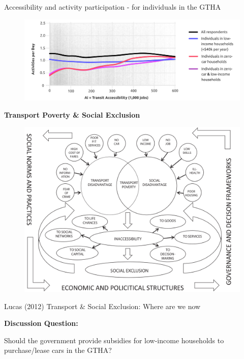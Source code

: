 \documentclass[aspectratio=169]{beamer}
\begin{document}
\begin{frame}
	
	Accessibility and activity participation - for individuals in the GTHA
	
	\begin{figure}
		\centering
		\includegraphics[width=0.94\linewidth]{images/accessibility_activities_gtha.png}
	\end{figure}
	
\end{frame}








\begin{frame}
	
	\textbf{Transport Poverty \& Social Exclusion}
	
	\begin{figure}
		\centering
		\includegraphics[width=0.74\linewidth]{images/transportpoverty.png}
	\end{figure}
	
	\tiny Lucas (2012) Transport \& Social Exclusion: Where are we now
	
\end{frame}









\begin{frame}
	
	\textbf{Discussion Question:}
	
	\vspace{2mm}
	
	Should the government provide subsidies for low-income households to purchase/lease cars in the GTHA?
	
\end{frame}
\end{document}
